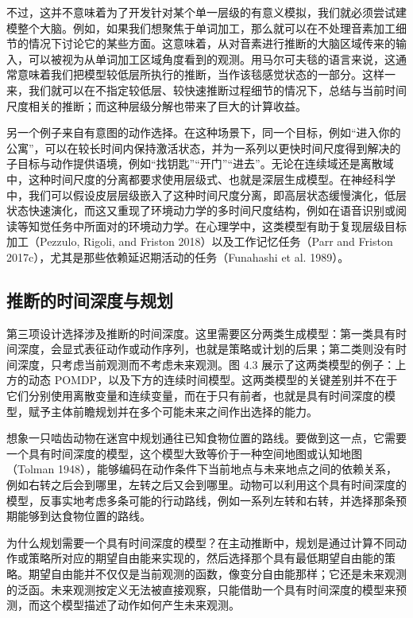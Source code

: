 不过，这并不意味着为了开发针对某个单一层级的有意义模拟，我们就必须尝试建模整个大脑。例如，如果我们想聚焦于单词加工，那么就可以在不处理音素加工细节的情况下讨论它的某些方面。这意味着，从对音素进行推断的大脑区域传来的输入，可以被视为从单词加工区域角度看到的观测。用马尔可夫毯的语言来说，这通常意味着我们把模型较低层所执行的推断，当作该毯感觉状态的一部分。这样一来，我们就可以在不指定较低层、较快速推断过程细节的情况下，总结与当前时间尺度相关的推断；而这种层级分解也带来了巨大的计算收益。

另一个例子来自有意图的动作选择。在这种场景下，同一个目标，例如“进入你的公寓”，可以在较长时间内保持激活状态，并为一系列以更快时间尺度得到解决的子目标与动作提供语境，例如“找钥匙”“开门”“进去”。无论在连续域还是离散域中，这种时间尺度的分离都要求使用层级式、也就是深层生成模型。在神经科学中，我们可以假设皮层层级嵌入了这种时间尺度分离，即高层状态缓慢演化，低层状态快速演化，而这又重现了环境动力学的多时间尺度结构，例如在语音识别或阅读等知觉任务中所面对的环境动力学。在心理学中，这类模型有助于复现层级目标加工（Pezzulo, Rigoli, and Friston 2018）以及工作记忆任务（Parr and Friston 2017c），尤其是那些依赖延迟期活动的任务（Funahashi et al. 1989）。

\subsection{推断的时间深度与规划}

第三项设计选择涉及推断的时间深度。这里需要区分两类生成模型：第一类具有时间深度，会显式表征动作或动作序列，也就是策略或计划的后果；第二类则没有时间深度，只考虑当前观测而不考虑未来观测。图 4.3 展示了这两类模型的例子：上方的动态 POMDP，以及下方的连续时间模型。这两类模型的关键差别并不在于它们分别使用离散变量和连续变量，而在于只有前者，也就是具有时间深度的模型，赋予主体前瞻规划并在多个可能未来之间作出选择的能力。

想象一只啮齿动物在迷宫中规划通往已知食物位置的路线。要做到这一点，它需要一个具有时间深度的模型，这个模型大致等价于一种空间地图或认知地图（Tolman 1948），能够编码在动作条件下当前地点与未来地点之间的依赖关系，例如右转之后会到哪里，左转之后又会到哪里。动物可以利用这个具有时间深度的模型，反事实地考虑多条可能的行动路线，例如一系列左转和右转，并选择那条预期能够到达食物位置的路线。

为什么规划需要一个具有时间深度的模型？在主动推断中，规划是通过计算不同动作或策略所对应的期望自由能来实现的，然后选择那个具有最低期望自由能的策略。期望自由能并不仅仅是当前观测的函数，像变分自由能那样；它还是未来观测的泛函。未来观测按定义无法被直接观察，只能借助一个具有时间深度的模型来预测，而这个模型描述了动作如何产生未来观测。

